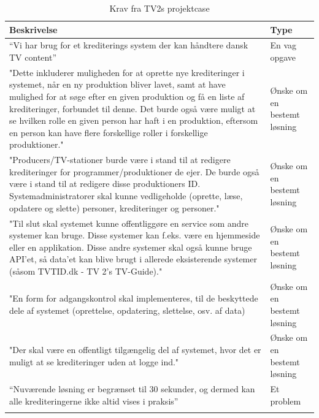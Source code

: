 \begin{longtable}{|p{12cm}|p{4cm}|}
\hline
\textbf{Beskrivelse} & \textbf{Type} \\
\hline
“Vi har brug for  et krediterings system der kan  håndtere  dansk TV content” 
& En vag opgave \\

\hline
"Dette inkluderer muligheden for at oprette nye krediteringer i systemet, når en ny produktion bliver lavet, samt at have mulighed for at søge efter en given produktion og få en liste af krediteringer, forbundet til denne. Det burde også være muligt at se hvilken rolle en given person har haft i en produktion, eftersom en person kan have flere forskellige roller i forskellige produktioner."
& Ønske om en bestemt løsning \\

\hline 
"Producers/TV-stationer burde være i stand til at redigere krediteringer for programmer/produktioner de ejer. De burde også være i stand til at redigere disse produktioners ID. Systemadministratorer skal kunne vedligeholde (oprette, læse, opdatere og slette) personer, krediteringer og personer."
& Ønske om en bestemt løsning \\

\hline
"Til slut skal systemet kunne offentliggøre en service som andre systemer kan bruge. Disse systemer kan f.eks. være en hjemmeside eller en applikation. Disse andre systemer skal også kunne bruge API'et, så data'et kan blive brugt i allerede eksisterende systemer (såsom TVTID.dk - TV 2's TV-Guide)."
& Ønske om en bestemt løsning \\

\hline
"En form for adgangskontrol skal implementeres, til de beskyttede dele af systemet (oprettelse, opdatering, slettelse, osv. af data)
& Ønske om en bestemt løsning \\

\hline
"Der skal være en offentligt tilgængelig del af systemet, hvor det er muligt at se krediteringer uden at logge ind."
& Ønske om en bestemt løsning \\

\hline
“Nuværende løsning er begrænset til 30 sekunder, og dermed kan alle krediteringerne ikke altid vises i praksis” 
& Et problem \\

\hline
\caption{Krav fra TV2s projektcase}
\label{table:kravFraCase}
\end{longtable}

